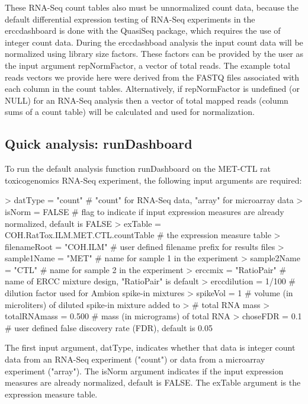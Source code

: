 \documentclass{article}
\begin{document}
These RNA-Seq count tables also must be unnormalized count data, because the 
default differential expression testing of
RNA-Seq experiments in the erccdashboard is done with the QuasiSeq package, 
which requires the use of integer count data. During the erccdashboad analysis 
the input count data will be normalized using library size factors. These factors
can be provided by the user as the input argument repNormFactor, a 
vector of total reads. The example total reads vectors we provide here were
derived from the FASTQ files associated with each column in the count tables. 
Alternatively, if repNormFactor is undefined (or NULL) for an RNA-Seq analysis 
then a vector of total mapped reads (column sums of a count table) will be 
calculated and used for normalization. 

\subsection{Quick analysis: runDashboard}
To run the default analysis function runDashboard on the MET-CTL rat 
toxicogenomics RNA-Seq experiment, the following input arguments are required:

\begin{Schunk}
\begin{Sinput}
> datType = "count" # "count" for RNA-Seq data, "array" for microarray data
> isNorm = FALSE # flag to indicate if input expression measures are already normalized, default is FALSE
> exTable = COH.RatTox.ILM.MET.CTL.countTable # the expression measure table
> filenameRoot = "COH.ILM" # user defined filename prefix for results files
> sample1Name = "MET" # name for sample 1 in the experiment
> sample2Name = "CTL" # name for sample 2 in the experiment
> erccmix = "RatioPair" # name of ERCC mixture design, "RatioPair" is default
> erccdilution = 1/100 # dilution factor used for Ambion spike-in mixtures
> spikeVol = 1 # volume (in microliters) of diluted spike-in mixture added to 
>              #   total RNA mass
> totalRNAmass = 0.500 # mass (in micrograms) of total RNA 
> choseFDR = 0.1 # user defined false discovery rate (FDR), default is 0.05
\end{Sinput}
\end{Schunk}

The first input argument, datType, indicates whether that data is integer count data from an RNA-Seq experiment ("count") or data from a microarray experiment ("array"). The isNorm argument indicates if the input expression measures are already normalized, default is FALSE.
The exTable argument is the expression measure table.
\end{document}
